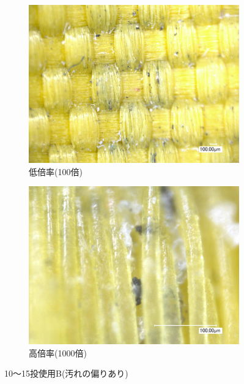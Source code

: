 \documentclass[main]{subfiles}
\begin{document}
\begin{figure}[H]
    \centering
    \begin{subfigure}[htbp]{0.45\linewidth}
        \centering
        \includegraphics[keepaspectratio, width=0.8\linewidth]{figures/縁/カーリングパッド10-15低倍率B.jpg}
        \caption{低倍率(100倍)}
        \label{fig:label}
    \end{subfigure}
    \begin{subfigure}[htbp]{0.45\linewidth}
        \centering
        \includegraphics[keepaspectratio, width=0.8\linewidth]{figures/縁/カーリングパッド10-15B.jpg}
        \caption{高倍率(1000倍)}
        \label{fig:label}
    \end{subfigure}
    \caption{10～15投使用B(汚れの偏りあり)}
    \label{fig:3}
\end{figure}
\end{document}
